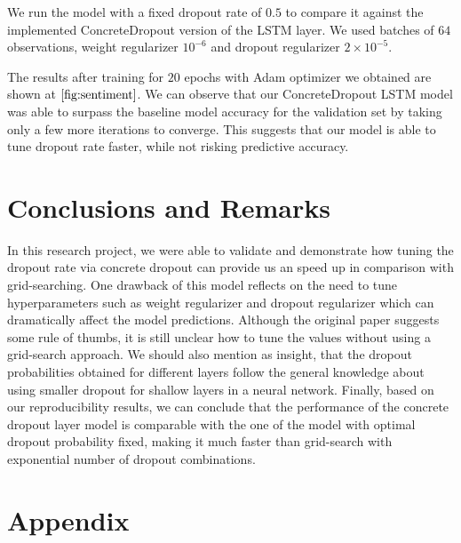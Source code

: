 \documentclass{article}
\begin{document}
We run the model with a fixed dropout rate of $0.5$ to compare it against the implemented ConcreteDropout version of the LSTM layer. We used batches of $64$ observations, weight regularizer $10^{-6}$ and dropout regularizer $2\times 10^{-5}$. 

The results after training for $20$ epochs with Adam optimizer we obtained are shown at $\ref{fig:sentiment}$. We can observe that our ConcreteDropout LSTM model was able to surpass the baseline model accuracy for the validation set by taking only a few more iterations to converge. This suggests that our model is able to tune dropout rate faster, while not risking predictive accuracy.  

\section{Conclusions and Remarks}
 
 In this research project, we were able to validate and demonstrate how tuning the dropout rate via concrete dropout can provide us an speed up in comparison with grid-searching. One drawback of this model reflects on the need to tune hyperparameters such as weight regularizer and dropout regularizer which can dramatically affect the model predictions. Although the original paper suggests some rule of thumbs, it is still unclear how to tune the values without using a grid-search approach. We should also mention as insight, that the dropout probabilities obtained for different layers follow the general knowledge about using smaller dropout for shallow layers in a neural network. Finally, based on our reproducibility results, we can conclude that the performance of the concrete dropout layer model is comparable with the one of the model with optimal dropout probability fixed, making it much faster than grid-search with exponential number of dropout combinations. 



\newpage



\newpage
\section{Appendix}
\end{document}

